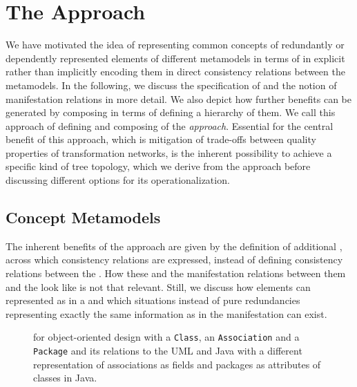 \section{The \commonalities Approach}
\label{chap:improvement:commonalities}

We have motivated the idea of representing common concepts of redundantly or dependently represented elements of different metamodels in terms of \commonalities in explicit \conceptmetamodels rather than implicitly encoding them in direct consistency relations between the metamodels.
In the following, we discuss the specification of \conceptmetamodels and the notion of manifestation relations in more detail.
We also depict how further benefits can be generated by composing \conceptmetamodels in terms of defining a hierarchy of them.
We call this approach of defining and composing \conceptmetamodels of \commonalities the \emph{\commonalities approach}.
Essential for the central benefit of this approach, which is mitigation of trade-offs between quality properties of transformation networks, is the inherent possibility to achieve a specific kind of tree topology, which we derive from the approach before discussing different options for its operationalization.


\subsection{Concept Metamodels}

The inherent benefits of the \commonalities approach are given by the definition of additional \conceptmetamodels, across which consistency relations are expressed, instead of defining consistency relations between the \concretemetamodels.
How these \conceptmetamodels and the manifestation relations between them and the \concretemetamodels look like is not that relevant.
Still, we discuss how elements can represented as \commonalities in a \conceptmetamodel and which situations instead of pure redundancies representing exactly the same information as in the manifestation can exist.

\begin{figure}
    \centering
    
    \caption[Multiple \commonality example for object-oriented design]{\Conceptmetamodel for object-oriented design with a \texttt{Class}, an \texttt{Association} and a \texttt{Package} \commonality and its relations to the \concretemetamodels \gls{UML} and Java with a different representation of associations as fields and packages as attributes of classes in Java.}
    \label{fig:improvement:multiple_commonalities_example}
\end{figure}


